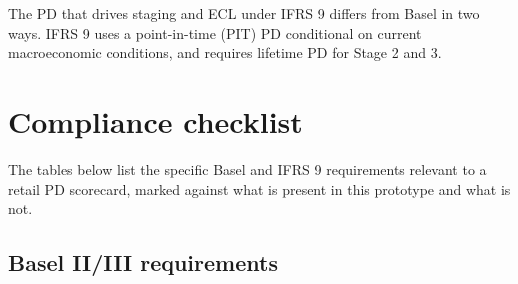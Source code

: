 \documentclass[a4paper,11pt]{article}
\begin{document}
The PD that drives staging and ECL under IFRS 9 differs from Basel in
two ways. IFRS 9 uses a point-in-time (PIT) PD conditional on current
macroeconomic conditions, and requires lifetime PD for Stage 2 and 3.

\section{Compliance checklist}

The tables below list the specific Basel and IFRS 9 requirements
relevant to a retail PD scorecard, marked against what is present in
this prototype and what is not.

\subsection{Basel II/III requirements}
\end{document}
